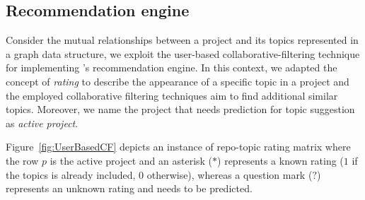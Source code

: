 

\subsection{Recommendation engine}
Consider the mutual relationships between a project and its topics represented in a graph data structure, we exploit the user-based collaborative-filtering technique for implementing \TF's recommendation engine. 
In this context, we adapted the concept of \emph{rating} to describe the appearance of a specific topic in a project and the employed collaborative filtering techniques aim to find additional similar topics. Moreover, we name the project that needs prediction for topic suggestion as \emph{active project}. 

Figure~\ref{fig:UserBasedCF} depicts an instance of repo-topic rating matrix where the row $p$ is the active project and an asterisk ($*$) represents a known rating (\ie $1$ if the topics is already included, $0$ otherwise), whereas a question mark ($?$) represents an unknown rating and needs to be predicted.


